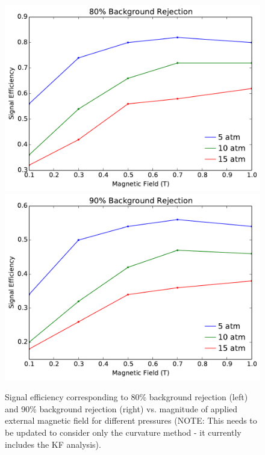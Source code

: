 \documentclass{JINST}
\begin{document}
\begin{figure}[!htb]
	\centering
	\includegraphics[scale=0.43]{fig/eff_vs_b_80.pdf}
	\includegraphics[scale=0.43]{fig/eff_vs_b_90.pdf}
	\caption{\label{fig_config}Signal efficiency corresponding to 80\% background rejection (left) and 90\% background rejection (right) vs. magnitude of applied external magnetic field for different pressures (NOTE: This needs to be updated to consider only the curvature method - it currently includes the KF analysis).}
\end{figure}

\end{document}
